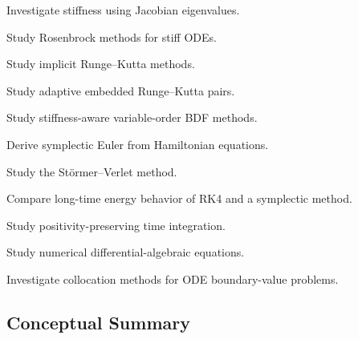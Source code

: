 \begin{exercise}[4]
Investigate stiffness using Jacobian eigenvalues.
\end{exercise}

\begin{exercise}[4]
Study Rosenbrock methods for stiff ODEs.
\end{exercise}

\begin{exercise}[4]
Study implicit Runge--Kutta methods.
\end{exercise}

\begin{exercise}[4]
Study adaptive embedded Runge--Kutta pairs.
\end{exercise}

\begin{exercise}[4]
Study stiffness-aware variable-order BDF methods.
\end{exercise}

\begin{exercise}[4]
Derive symplectic Euler from Hamiltonian equations.
\end{exercise}

\begin{exercise}[4]
Study the Störmer--Verlet method.
\end{exercise}

\begin{exercise}[4]
Compare long-time energy behavior of RK4 and a symplectic method.
\end{exercise}

\begin{exercise}[4]
Study positivity-preserving time integration.
\end{exercise}

\begin{exercise}[4]
Study numerical differential-algebraic equations.
\end{exercise}

\begin{exercise}[4]
Investigate collocation methods for ODE boundary-value problems.
\end{exercise}

\subsection{Conceptual Summary}
\label{subsec:numerical-ode-summary}


